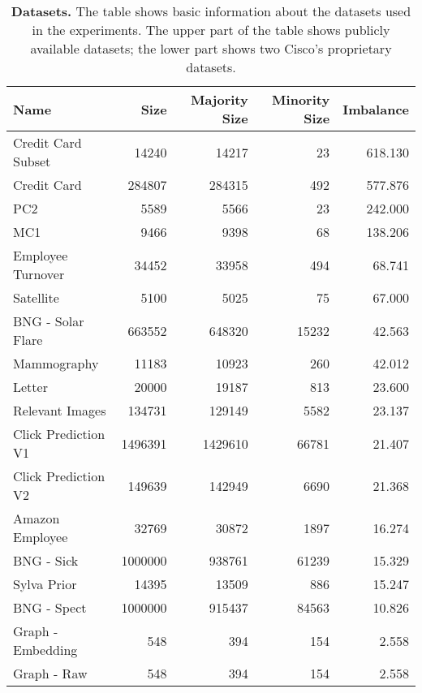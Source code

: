 \begin{table}[ht]
    \centering

    \begin{tabular}{lrrrr}
        \toprule
        Name & Size & Majority Size & Minority Size & Imbalance \\
        \midrule
        Credit Card Subset & 14240 & 14217 & 23 & 618.130 \\
        Credit Card & 284807 & 284315 & 492 & 577.876 \\
        PC2 & 5589 & 5566 & 23 & 242.000 \\
        MC1 & 9466 & 9398 & 68 & 138.206 \\
        Employee Turnover & 34452 & 33958 & 494 & 68.741 \\
        Satellite & 5100 & 5025 & 75 & 67.000 \\
        BNG - Solar Flare & 663552 & 648320 & 15232 & 42.563 \\
        Mammography & 11183 & 10923 & 260 & 42.012 \\
        Letter & 20000 & 19187 & 813 & 23.600 \\
        Relevant Images & 134731 & 129149 & 5582 & 23.137 \\
        Click Prediction V1 & 1496391 & 1429610 & 66781 & 21.407 \\
        Click Prediction V2 & 149639 & 142949 & 6690 & 21.368 \\
        Amazon Employee & 32769 & 30872 & 1897 & 16.274 \\
        BNG - Sick & 1000000 & 938761 & 61239 & 15.329 \\
        Sylva Prior & 14395 & 13509 & 886 & 15.247 \\
        BNG - Spect & 1000000 & 915437 & 84563 & 10.826 \\
        \midrule
        Graph - Embedding & 548 & 394 & 154 & 2.558 \\
        Graph - Raw & 548 & 394 & 154 & 2.558 \\
        \bottomrule
    \end{tabular}

    \caption{
        \textbf{Datasets.} The table shows basic information about the datasets used in the
        experiments. The upper part of the table shows publicly available datasets; the lower part
        shows two Cisco's proprietary datasets.
    }
    \label{table:datasets}
\end{table}
